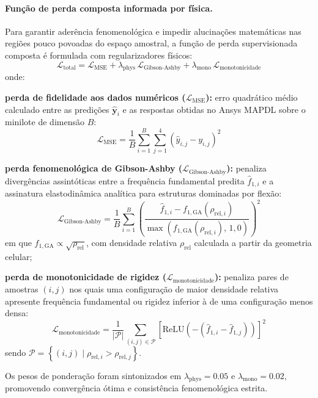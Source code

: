 \paragraph*{Função de perda composta informada por física.}
\label{par:perda}
Para garantir aderência fenomenológica e impedir alucinações matemáticas nas regiões pouco povoadas do espaço amostral, a função de perda supervisionada composta é formulada com regularizadores físicos:
\begin{equation}
  \mathcal{L}_{\text{total}} = \mathcal{L}_{\text{MSE}} + \lambda_{\text{phys}}\,\mathcal{L}_{\text{Gibson-Ashby}} + \lambda_{\text{mono}}\,\mathcal{L}_{\text{monotonicidade}}
  \label{eq:perda-total}
\end{equation}
onde:
\begin{alineas}
  \item \textbf{perda de fidelidade aos dados numéricos ($\mathcal{L}_{\text{MSE}}$):} erro quadrático médio calculado entre as predições $\hat{\mathbf{y}}_i$ e as respostas obtidas no Ansys MAPDL sobre o minilote de dimensão $B$:
  \begin{equation}
    \mathcal{L}_{\text{MSE}} = \frac{1}{B} \sum_{i=1}^{B} \sum_{j=1}^{4} \left( \hat{y}_{i,j} - y_{i,j} \right)^{2}
    \label{eq:mse}
  \end{equation}
  \item \textbf{perda fenomenológica de Gibson-Ashby ($\mathcal{L}_{\text{Gibson-Ashby}}$):} penaliza divergências assintóticas entre a frequência fundamental predita $\hat{f}_{1,i}$ e a assinatura elastodinâmica analítica para estruturas dominadas por flexão:
  \begin{equation}
    \mathcal{L}_{\text{Gibson-Ashby}} = \frac{1}{B} \sum_{i=1}^{B} \left( \frac{\hat{f}_{1,i} - f_{1,\text{GA}}(\rho_{\text{rel},i})}{\max\!\left( f_{1,\text{GA}}(\rho_{\text{rel},i}),\, 1{,}0 \right)} \right)^{2}
    \label{eq:ga}
  \end{equation}
  em que $f_{1,\text{GA}} \propto \sqrt{\rho_{\text{rel}}}$, com densidade relativa $\rho_{\text{rel}}$ calculada a partir da geometria celular;
  \item \textbf{perda de monotonicidade de rigidez ($\mathcal{L}_{\text{monotonicidade}}$):} penaliza pares de amostras $(i,j)$ nos quais uma configuração de maior densidade relativa apresente frequência fundamental ou rigidez inferior à de uma configuração menos densa:
  \begin{equation}
    \mathcal{L}_{\text{monotonicidade}} = \frac{1}{|\mathcal{P}|} \sum_{(i,j) \in \mathcal{P}} \left[ \mathrm{ReLU}\!\left( -\left( \hat{f}_{1,i} - \hat{f}_{1,j} \right) \right) \right]^{2}
    \label{eq:mono}
  \end{equation}
  sendo $\mathcal{P} = \left\{ (i,j) \mid \rho_{\text{rel},i} > \rho_{\text{rel},j} \right\}$.
\end{alineas}
Os pesos de ponderação foram sintonizados em $\lambda_{\text{phys}} = \num{0.05}$ e $\lambda_{\text{mono}} = \num{0.02}$, promovendo convergência ótima e consistência fenomenológica estrita.


